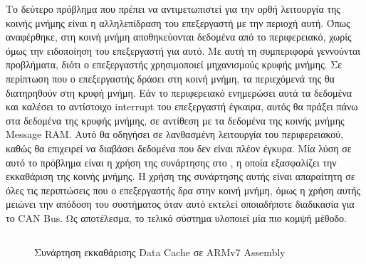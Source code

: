 \documentclass[a4paper,nobib,justified]{tufte-book}
\begin{document}


Το δεύτερο πρόβλημα που πρέπει να αντιμετωπιστεί για την ορθή λειτουργία της κοινής μνήμης είναι η αλληλεπίδραση του επεξεργαστή με την περιοχή αυτή. Όπως αναφέρθηκε, στη κοινή μνήμη αποθηκεύονται δεδομένα από το περιφερειακό, χωρίς όμως την ειδοποίηση του επεξεργαστή για αυτό. Με αυτή τη συμπεριφορά γεννούνται προβλήματα, διότι ο επεξεργαστής χρησιμοποιεί μηχανισμούς κρυφής μνήμης. Σε περίπτωση που ο επεξεργαστής δράσει στη κοινή μνήμη, τα περιεχόμενά της θα διατηρηθούν στη κρυφή μνήμη. Εάν το περιφερειακό ενημερώσει αυτά τα δεδομένα και καλέσει το αντίστοιχο interrupt του επεξεργαστή έγκαιρα, αυτός θα πράξει πάνω στα δεδομένα της κρυφής μνήμης, σε αντίθεση με τα δεδομένα της κοινής μνήμης Message RAM. Αυτό θα οδηγήσει σε λανθασμένη λειτουργία του περιφερειακού, καθώς θα επιχειρεί να διαβάσει δεδομένα που δεν είναι πλέον έγκυρα. Μία λύση σε αυτό το πρόβλημα είναι η χρήση της συνάρτησης στο , η οποία εξασφαλίζει την εκκαθάριση της κοινής μνήμης. Η χρήση της συνάρτησης αυτής είναι απαραίτητη σε όλες τις περιπτώσεις που ο επεξεργαστής δρα στην κοινή μνήμη, όμως η χρήση αυτής μειώνει την απόδοση του συστήματος όταν αυτό εκτελεί οποιαδήποτε διαδικασία για το CAN Bus. Ως αποτέλεσμα, το τελικό σύστημα υλοποιεί μία πιο κομψή μέθοδο.

\begin{figure}
	\inputminted{asm}{code/examples/cache-clean-routine.asm}
	\label{code:cache-clean-routine}
	\caption[Συνάρτηση εκκαθάρισης Data Cache]{Συνάρτηση εκκαθάρισης Data Cache σε ARMv7 Assembly}
\end{figure}
\end{document}
